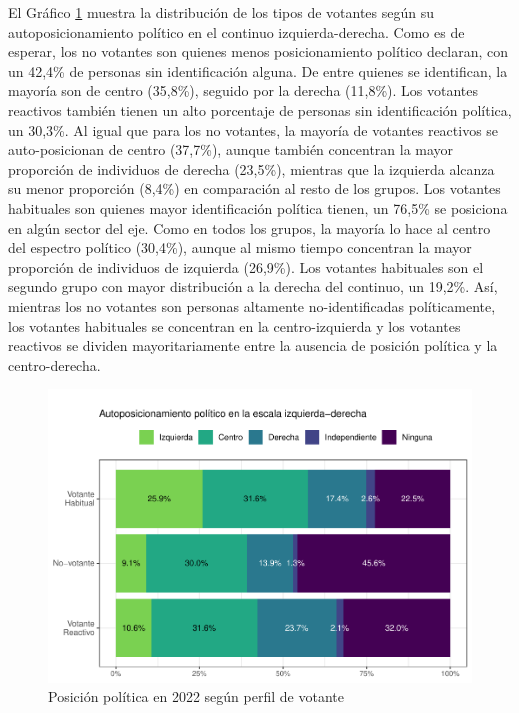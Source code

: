 \documentclass[
  12pt,
]{book}
\begin{document}
El Gráfico \ref{fig:graf-posicion-pol-2} muestra la distribución de los tipos de votantes según su autoposicionamiento político en el continuo izquierda-derecha. Como es de esperar, los no votantes son quienes menos posicionamiento político declaran, con un 42,4\% de personas sin identificación alguna. De entre quienes se identifican, la mayoría son de centro (35,8\%), seguido por la derecha (11,8\%). Los votantes reactivos también tienen un alto porcentaje de personas sin identificación política, un 30,3\%. Al igual que para los no votantes, la mayoría de votantes reactivos se auto-posicionan de centro (37,7\%), aunque también concentran la mayor proporción de individuos de derecha (23,5\%), mientras que la izquierda alcanza su menor proporción (8,4\%) en comparación al resto de los grupos. Los votantes habituales son quienes mayor identificación política tienen, un 76,5\% se posiciona en algún sector del eje. Como en todos los grupos, la mayoría lo hace al centro del espectro político (30,4\%), aunque al mismo tiempo concentran la mayor proporción de individuos de izquierda (26,9\%). Los votantes habituales son el segundo grupo con mayor distribución a la derecha del continuo, un 19,2\%. Así, mientras los no votantes son personas altamente no-identificadas políticamente, los votantes habituales se concentran en la centro-izquierda y los votantes reactivos se dividen mayoritariamente entre la ausencia de posición política y la centro-derecha.

\begin{figure}

{\centering \includegraphics{reporte-elsoc_files/figure-latex/graf-posicion-pol-2-1} 

}

\caption{Posición política en 2022 según perfil de votante}\label{fig:graf-posicion-pol-2}
\end{figure}
\end{document}
